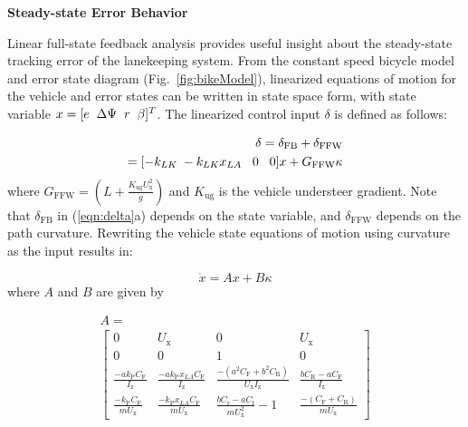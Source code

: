 \documentclass[10pt,a4paper]{article}
\def\subsection#1{\refstepcounter{subsection} \noindent
{\normalsize\bf {\thesubsection}} \hspace{0.5mm} {\normalsize\bf #1} \par}
\begin{document}
\vspace{5 mm}
\subsection{Steady-state Error Behavior}

Linear full-state feedback analysis provides useful insight about the steady-state tracking error of the lanekeeping system. From the constant speed 
bicycle model and error state diagram (Fig.~\ref{fig:bikeModel}), linearized equations of motion for the vehicle and error states can be written in state 
space form, with state variable $x= [e \hspace{2 mm} \Delta\Psi \hspace{2 mm} r \hspace{2 mm} \beta]^T$. The linearized control input $\delta$ is defined as follows:

\begin{subequations}
\label{eqn:delta}
\begin{align}
        \delta=\delta_\mathrm{FB}+\delta_\mathrm{FFW} \\
              =[-k_{LK} \hspace{1 mm} -k_{LK} x_{LA} \hspace{3 mm} 0 \hspace{3 mm} 0] x+G_\mathrm{FFW} \kappa
\end{align}
\end{subequations}
 where $G_\mathrm{FFW}= (L+\frac{K_\mathrm{ug} U_\mathrm{x}^2}{g})$ and $K_\mathrm{ug}$ is the vehicle understeer gradient.
Note that $\delta_\mathrm{FB}$ in (\ref{eqn:delta}a) depends on the state variable, and $\delta_\mathrm{FFW}$ depends on the path curvature. Rewriting  
the vehicle state equations of motion using curvature as the input results in:

\begin{equation}
	\label{eqn:sseq}
	\dot{x} = Ax + B\kappa
\end{equation}
where $A$ and $B$ are given by 

\begin{multline}
\label{eqn:Amatrix}
A  =  \\
\left[\begin{smallmatrix}
  0 & U_\mathrm{x} & 0 & U_\mathrm{x} \\ 
  0 & 0 & 1 & 0 \\ 
  \frac{-ak_\mathrm{P} C_\mathrm{F}}{I_\mathrm{z}}  & \frac{-ak_\mathrm{P}x_{LA}C_\mathrm{F}}{I_\mathrm{z}}  & \frac{-(a^2C_\mathrm{F}+b^2C_\mathrm{R})}{U_\mathrm{x}I_\mathrm{z}} & \frac{bC_\mathrm{R} - aC_\mathrm{F}}{I_\mathrm{z}}  \\
  \frac{-k_\mathrm{P}C_\mathrm{F}}{mU_\mathrm{x}}  & \frac{-k_\mathrm{P}x_{LA}C_\mathrm{F}}{mU_\mathrm{x}}  & \frac{bC_\mathrm{r}-aC_\mathrm{f}}{mU_\mathrm{x}^2}-1 & \frac{-(C_\mathrm{F} + C_\mathrm{R})}{mU_\mathrm{x}}
 \end{smallmatrix}\right]
 \end{multline}
\end{document}
